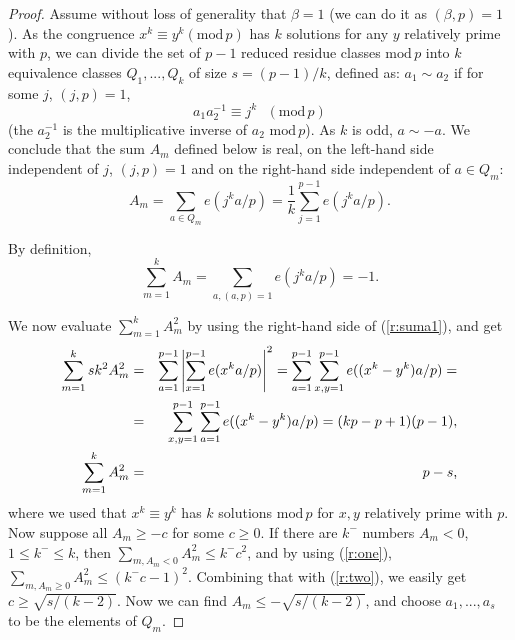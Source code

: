 \documentclass{amsart}
\numberwithin {equation}{section}
\begin{document}
\begin{proof}
Assume without loss of generality that $\beta =1$ (we can do it as $(\beta
,p)=1$). As the congruence $x^{k}\equiv y^{k}({\mathrm{mod}}\,p)$ has $k$
solutions for any $y$ relatively prime with $p$, we can divide the set of $p-1$ reduced residue classes ${\mathrm{mod}}\,p$ into $k$ equivalence
classes $Q_{1},...,Q_{k}$ of size $s=(p-1)/k$, defined as: $a_{1}\sim a_{2}$
if for some $j$, $(j,p)=1$, 
\begin{equation*}
a_{1}a_{2}^{-1}\equiv j^{k}{\text{ }}({\mathrm{mod}}\,p)
\end{equation*}(the $a_{2}^{-1}$ is the multiplicative inverse of $a_{2}$ ${\mathrm{mod}}\,p $). As $k$ is odd, $a\sim -a$. We conclude that the sum $A_{m}$ defined
below is real, on the left-hand side independent of $j$, $(j,p)=1$ and on
the right-hand side independent of $a\in Q_{m}$: 
\begin{equation}
A_{m}=\sum_{a\in Q_{m}}e(j^{k}a/p)=\frac{1}{k}\sum_{j=1}^{p-1}e(j^{k}a/p){\text{.}}  \label{r:suma1}
\end{equation}

By definition, 
\begin{equation}
\sum _{m=1}^{k}A_{m}=\sum _{a,(a,p)=1}e(j^{k}a/p)=-1{\text {.}}
\label{r:one}
\end{equation}

We now evaluate $\sum_{m=1}^{k}A_{m}^{2}$ by using the right-hand side of (\ref{r:suma1}), and get 
\begin{eqnarray}
\sum_{m=1}^{k}sk^{2}A_{m}^{2} &=&\sum_{a=1}^{p-1}\left\vert
\sum_{x=1}^{p-1}e(x^{k}a/p)\right\vert
^{2}=\sum_{a=1}^{p-1}\sum_{x,y=1}^{p-1}e((x^{k}-y^{k})a/p)=  \notag \\
&=&\sum_{x,y=1}^{p-1}\sum_{a=1}^{p-1}e((x^{k}-y^{k})a/p)=(kp-p+1)(p-1), 
\notag \\
\sum_{m=1}^{k}A_{m}^{2} &=&p-s{\text{,}}  \label{r:two}
\end{eqnarray}where we used that $x^{k}\equiv y^{k}$ has $k$ solutions ${\mathrm{mod}}\,p$
for $x,y$ relatively prime with $p$. Now suppose all $A_{m}\geq -c$ for some 
$c\geq 0$. If there are $k^{-}$ numbers $A_{m}<0$, $1\leq k^{-}\leq k$, then 
$\sum_{m,A_{m}<0}A_{m}^{2}\leq k^{-}c^{2}$, and by using (\ref{r:one}), $\sum_{m,A_{m}\geq 0}A_{m}^{2}\leq (k^{-}c-1)^{2}$. Combining that with (\ref{r:two}), we easily get $c\geq \sqrt{s/(k-2)}$. Now we can find $A_{m}\leq -\sqrt{s/(k-2)}$, and choose $a_{1},...,a_{s}$ to be the elements of $Q_{m}$.
\end{proof}
\end{document}
